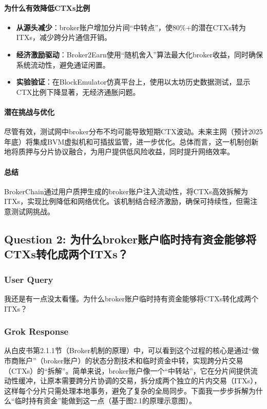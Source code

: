 \documentclass[a4paper,12pt]{ctexart}
\begin{document}
\paragraph{为什么有效降低CTXs比例}
\begin{itemize}
  \item \textbf{从源头减少}：broker账户增加分片间“中转点”，使80\%+的潜在CTXs转为ITXs，减少跨分片通信开销。
  \item \textbf{经济激励驱动}：Broker2Earn使用“随机舍入”算法最大化broker收益，同时确保系统流动性，避免通证闲置。
  \item \textbf{实验验证}：在BlockEmulator仿真平台上，使用以太坊历史数据测试，显示CTX比例下降显著，无经济通胀问题。
\end{itemize}

\paragraph{潜在挑战与优化}
尽管有效，测试网中broker分布不均可能导致短期CTX波动。未来主网（预计2025年底）将集成BVM虚拟机和可插拔监管，进一步优化。总体而言，这一机制创新地将质押与分片协议融合，为用户提供低风险收益，同时提升网络效率。

\paragraph*{总结}
BrokerChain通过用户质押生成的broker账户注入流动性，将CTXs高效拆解为ITXs，实现比例降低和网络优化。该机制结合经济激励，确保可持续性，但需注意测试网挑战。

\subsection*{Question 2: 为什么broker账户临时持有资金能够将CTXs转化成两个ITXs？}
\subsubsection*{User Query}
我还是有一点没太看懂。为什么broker账户临时持有资金能够将CTXs转化成两个ITXs？

\subsubsection*{Grok Response}
从白皮书第2.1.1节（Broker机制的原理）中，可以看到这个过程的核心是通过“做市商账户”（broker账户）的状态分割技术和临时资金中转，实现跨分片交易（CTXs）的“拆解”。简单来说，broker账户像一个“中转站”，它在分片间提供流动性缓冲，让原本需要跨分片协调的交易，拆分成两个独立的片内交易（ITXs），这样每个分片只需处理本地事务，避免了复杂的全局同步。下面我一步步拆解为什么“临时持有资金”能做到这一点（基于图2.1的原理示意图）。
\end{document}
